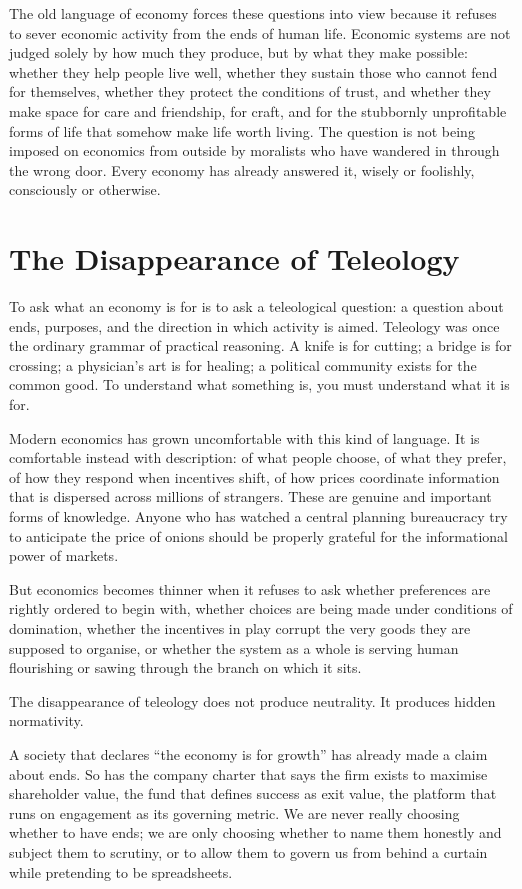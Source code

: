 \documentclass[11pt,a4paper,oneside]{book}
\begin{document}
The old language of economy forces these questions into view because it refuses to sever economic activity from the ends of human life. Economic systems are not judged solely by how much they produce, but by what they make possible: whether they help people live well, whether they sustain those who cannot fend for themselves, whether they protect the conditions of trust, and whether they make space for care and friendship, for craft, and for the stubbornly unprofitable forms of life that somehow make life worth living. The question is not being imposed on economics from outside by moralists who have wandered in through the wrong door. Every economy has already answered it, wisely or foolishly, consciously or otherwise.

\section*{The Disappearance of Teleology}

To ask what an economy is for is to ask a teleological question: a question about ends, purposes, and the direction in which activity is aimed. Teleology was once the ordinary grammar of practical reasoning. A knife is for cutting; a bridge is for crossing; a physician's art is for healing; a political community exists for the common good. To understand what something is, you must understand what it is for.

Modern economics has grown uncomfortable with this kind of language. It is comfortable instead with description: of what people choose, of what they prefer, of how they respond when incentives shift, of how prices coordinate information that is dispersed across millions of strangers. These are genuine and important forms of knowledge. Anyone who has watched a central planning bureaucracy try to anticipate the price of onions should be properly grateful for the informational power of markets.

But economics becomes thinner when it refuses to ask whether preferences are rightly ordered to begin with, whether choices are being made under conditions of domination, whether the incentives in play corrupt the very goods they are supposed to organise, or whether the system as a whole is serving human flourishing or sawing through the branch on which it sits.

The disappearance of teleology does not produce neutrality. It produces hidden normativity.

A society that declares ``the economy is for growth'' has already made a claim about ends. So has the company charter that says the firm exists to maximise shareholder value, the fund that defines success as exit value, the platform that runs on engagement as its governing metric. We are never really choosing whether to have ends; we are only choosing whether to name them honestly and subject them to scrutiny, or to allow them to govern us from behind a curtain while pretending to be spreadsheets.
\end{document}
